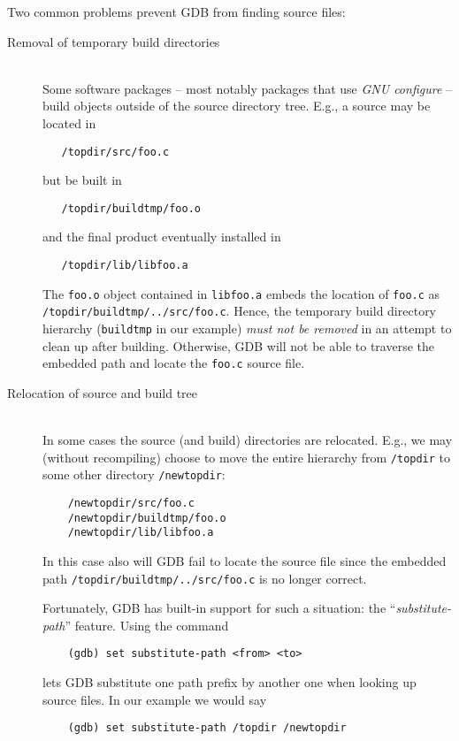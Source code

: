 \documentclass{article}
\begin{document}
	\noindent
	Two common problems prevent GDB from finding source files:
\begin{description}
	\item[Removal of temporary build directories]\hfill\\
	Some software packages -- most notably packages that
	use {\em GNU configure} -- build objects outside
    of the source directory tree. E.g., a source may be
    located in
\begin{verbatim}
   /topdir/src/foo.c
\end{verbatim}
    but be built in
\begin{verbatim}
   /topdir/buildtmp/foo.o
\end{verbatim}
    and the final product eventually installed in
\begin{verbatim}
   /topdir/lib/libfoo.a
\end{verbatim}

	The {\tt foo.o} object contained in {\tt libfoo.a}
	embeds the location of {\tt foo.c} as {\tt /topdir/buildtmp/../src/foo.c}.	
	Hence, the temporary build directory hierarchy ({\tt buildtmp}
	in our example) {\em must not be removed} in an attempt to clean
	up after building.
	Otherwise, GDB will not be able to traverse the embedded path and
	locate the {\tt foo.c} source file.
	\item[Relocation of source and build tree]\hfill\\
	In some cases the source (and build) directories are
	relocated. E.g., we may (without recompiling) choose to move
	the entire hierarchy from {\tt /topdir} to some other
	directory {\tt /newtopdir}:
\begin{verbatim}
	/newtopdir/src/foo.c
	/newtopdir/buildtmp/foo.o
	/newtopdir/lib/libfoo.a
\end{verbatim}
	In this case also will GDB fail to locate the source file since
	the embedded path {\tt /topdir/buildtmp/../src/foo.c}
	is no longer correct.

	Fortunately, GDB has built-in support for such a situation:
	the ``{\em substitute-path}'' feature. Using the command
\begin{verbatim}
	(gdb) set substitute-path <from> <to>
\end{verbatim}
	lets GDB substitute one path prefix by another one when
	looking up source files. In our example we would say
\begin{verbatim}
	(gdb) set substitute-path /topdir /newtopdir
\end{verbatim}


\end{description}
\end{document}
